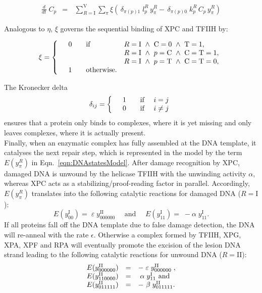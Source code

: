 \begin{eqnarray}\label{Eqn:concentration}
\frac{d}{dt}\;C_p&=&\,\sum_{R=\text{I}}^{\text{V}} \sum_{\pi} \xi \left( \,\delta_{\pi (p)1}\;l_{p}^{ R}\, y_{\pi}^{R}- \,\delta_{\pi (p)0}\; k_{p}^{ R} \,C_p\,y_{\pi}^{R}\right)
\end{eqnarray}  

Analogous to $\eta$, $\xi$ governs the sequential binding of XPC and TFIIH by:

\begin{align*}
\xi =\left\{
\begin{array}{l l ll}
& 0 \quad   &\text{if} & R=\text{I} ~\wedge~ \text{C}=0 ~\wedge~ \text{T}=1, \\
&    && R=\text{I} ~\wedge~ p=\text{C} ~\wedge~ \text{C}=\text{T}=1, \\
&    &&R=\text{I} ~\wedge~ p=\text{T} ~\wedge~ \text{C}=\text{T}=0, \\
& 1 \quad& \text{otherwise}.&
\end{array}
\right.
\end{align*}

The Kronecker delta 
 \begin{align*}
\delta_{ij}=\left\{
\begin{array}{l l l l}
&1 \quad   &\text{if} & i=j\\
&0 \quad& \text{if } & i \neq j\\
\end{array}
\right.
\end{align*}
ensures that a protein only binds to complexes, where it is yet missing and only leaves complexes, where it is actually present.\\
Finally, when an enzymatic complex has fully assembled at the DNA template, it catalyses the next repair step, which is represented in the model by the term $E(y_{\pi}^{R})$ in Eqn.\ \ref{eqn:DNAstatesModel}. After damage recognition by XPC, damaged DNA is unwound by the helicase TFIIH with the unwinding activity $\alpha$, whereas XPC acts as a stabilizing/proof-reading factor in parallel. Accordingly, $E(y_{\pi}^{R})$ translates into the following catalytic reactions for damaged DNA ($R= \text{I}$):
$$E(y_{00}^\text{I})=\;\varepsilon\;y_{000000}^\text{II} \quad \text{ and }\quad
E(y_{11}^\text{I})=\;-\alpha \;y_{11}^\text{I}.$$
If all proteins fall off the DNA template due to false damage detection, the DNA will re-anneal with the rate $\epsilon$. Otherwise a complex formed by TFIIH, XPG, XPA, XPF and RPA will eventually promote the excision of the lesion DNA strand leading to the following catalytic reactions for unwound DNA ($R= \text{II}$): 	
\begin{align*}
	\begin{array}{l l l}
		E(y_{000000}^\text{II})&=&-\;	\varepsilon	\;y_{000000}^\text{II}\;, \\ E(y_{110000}^\text{II})&=&\;	\alpha	\;y_{11}^\text{I} 	\text{ and }\\
	    E(y_{011111}^\text{II})&=&-\	\beta	\;y_{011111}^\text{II}.
	\end{array}
\end{align*}

